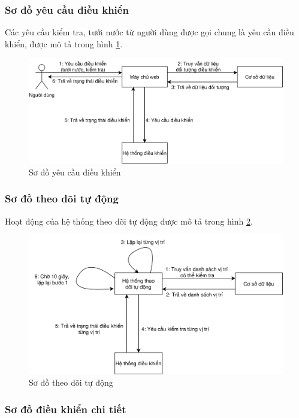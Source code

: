 \subsubsection{Sơ đồ yêu cầu điều khiển}
Các yêu cầu kiểm tra, tưới nước từ người dùng được gọi chung là yêu cầu điều khiển, được mô tả trong hình \ref{fig:collab-control}.
\begin{figure}[h]
	\centering
	\includegraphics[width=0.8\linewidth]{images/collab-control}
	\caption{Sơ đồ yêu cầu điều khiển}
	\label{fig:collab-control}
\end{figure}

\subsubsection{Sơ đồ theo dõi tự động}
Hoạt động của hệ thống theo dõi tự động được mô tả trong hình \ref{fig:collab-automation}.
\begin{figure}[h]
	\centering
	\includegraphics[width=0.8\linewidth]{images/collab-automation}
	\caption{Sơ đồ theo dõi tự động}
	\label{fig:collab-automation}
\end{figure}

\subsubsection{Sơ đồ điều khiển chi tiết}


